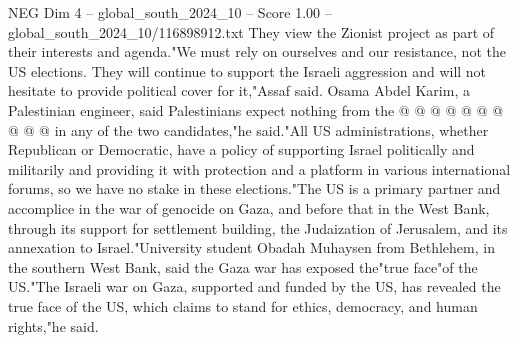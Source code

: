 \begin{textsample}{NEG Dim 4 – global\_south\_2024\_10 – Score 1.00 – global\_south\_2024\_10/116898912.txt}
They view the Zionist project as part of their interests and agenda."We must rely on ourselves and our resistance, not the US elections.
They will continue to support the Israeli aggression and will not hesitate to provide political cover for it,"Assaf said.
Osama Abdel Karim, a Palestinian engineer, said Palestinians expect nothing from the @ @ @ @ @ @ @ @ @ @ in any of the two candidates,"he said."All US administrations, whether Republican or Democratic, have a policy of supporting Israel politically and militarily and providing it with protection and a platform in various international forums, so we have no stake in these elections."The US is a primary partner and accomplice in the war of genocide on Gaza, and before that in the West Bank, through its support for settlement building, the Judaization of Jerusalem, and its annexation to Israel."University student Obadah Muhaysen from Bethlehem, in the southern West Bank, said the Gaza war has exposed the"true face"of the US."The Israeli war on Gaza, supported and funded by the US, has revealed the true face of the US, which claims to stand for ethics, democracy, and human rights,"he said.

\end{textsample}
